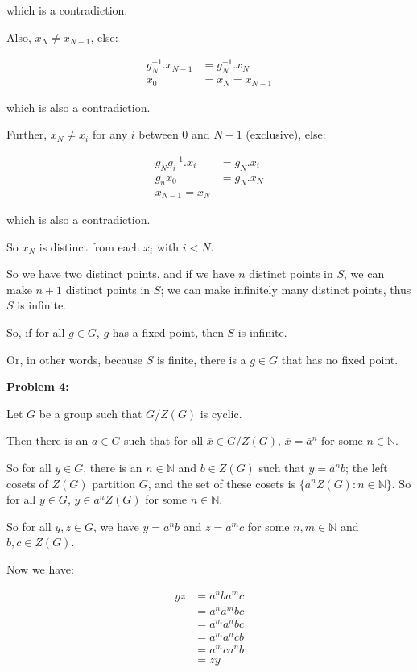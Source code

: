 \documentclass[a4paper,12pt]{article}
\newcommand{\tab}{\hspace{4mm}} %
\newcommand{\shunt}{\vspace{20mm}}
\newcommand{\N}{\mathbb{N}}
\begin{document}
\tab which is a contradiction.

\tab Also, $x_N \neq x_{N-1}$, else:

\begin{align*}
g_N^{-1}.x_{N-1} &= g_N^{-1}.x_N\\
x_0&= x_N=x_{N-1}
\end{align*} 

\tab which is also a contradiction.

\tab Further, $x_N \neq x_{i}$ for any $i$ between $0$ and $N-1$ (exclusive), else:

\begin{align*}
g_Ng_{i}^{-1}.x_i &= g_N.x_i\\
g_nx_0 &= g_N.x_N\\
x_{N-1} = x_N
\end{align*} 

\tab which is also a contradiction.

\tab So $x_N$ is distinct from each $x_i$ with $i < N$.

\tab So we have two distinct points, and if we have $n$ distinct points in $S$, we can make $n+1$ distinct points in $S$; we can make infinitely many distinct points, thus $S$ is infinite.

So, if for all $g \in G$, $g$ has a fixed point, then $S$ is infinite.

Or, in other words, because $S$ is finite, there is a $g \in G$ that has no fixed point.

\shunt

{\bf Problem 4:}

Let $G$ be a group such that $G/Z(G)$ is cyclic.

Then there is an $a \in G$ such that for all $\overline{x} \in G/Z(G)$, $\overline{x} = \overline{a}^n$ for some $n \in \N$.

So for all $y \in G$, there is an $n \in \N$ and $b \in Z(G)$ such that $y = a^nb$; the left cosets of $Z(G)$ partition $G$, and the set of these cosets is $\{a^nZ(G): n \in \N\}$. So for all $y \in G$, $y \in a^nZ(G)$ for some $n \in \N$. 

So for all $y, z \in G$, we have $y = a^nb$ and $z=a^mc$ for some $n,m \in \N$ and $b,c \in Z(G)$.

Now we have:

\begin{align*}
yz &= a^nba^mc\\
&=a^na^mbc\\
&=a^ma^nbc\\
&=a^ma^ncb\\
&=a^mca^nb\\
&=zy
\end{align*}
\end{document}
